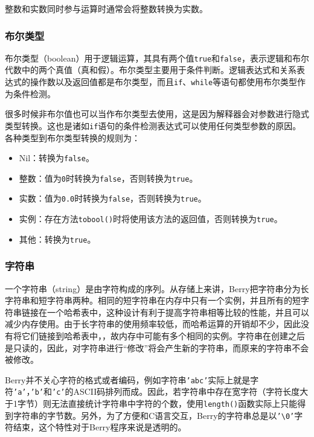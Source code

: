 整数和实数同时参与运算时通常会将整数转换为实数。

\subsubsection{布尔类型} \label{section:type_bool}

布尔类型（boolean）用于逻辑运算，其具有两个值\texttt{true}和\texttt{false}，表示逻辑和布尔代数中的两个真值（真和假）。布尔类型主要用于条件判断。逻辑表达式和关系表达式的操作数以及返回值都是布尔类型，而且\texttt{if}、\texttt{while}等语句都使用布尔类型作为条件检测。

很多时候非布尔值也可以当作布尔类型去使用，这是因为解释器会对参数进行隐式类型转换。这也是诸如\texttt{if}语句的条件检测表达式可以使用任何类型参数的原因。各种类型到布尔类型转换的规则为：
\begin{itemize}
    \item Nil：转换为\texttt{false}。
    \item 整数：值为\texttt{0}时转换为\texttt{false}，否则转换为\texttt{true}。
    \item 实数：值为\texttt{0.0}时转换为\texttt{false}，否则转换为\texttt{true}。
    \item 实例：存在方法\texttt{tobool()}时将使用该方法的返回值，否则转换为\texttt{true}。
    \item 其他：转换为\texttt{true}。
\end{itemize}

\subsubsection{字符串}

一个字符串（string）是由字符构成的序列。从存储上来讲，Berry把字符串分为长字符串和短字符串两种。相同的短字符串在内存中只有一个实例，并且所有的短字符串链接在一个哈希表中，这种设计有利于提高字符串相等比较的性能，并且可以减少内存使用。由于长字符串的使用频率较低，而哈希运算的开销却不少，因此没有将它们链接到哈希表中，，故内存中可能有多个相同的实例。字符串在创建之后是只读的，因此，对字符串进行``修改''将会产生新的字符串，而原来的字符串不会被修改。

Berry并不关心字符的格式或者编码，例如字符串\texttt{'abc'}实际上就是字符\texttt{'a'}，\texttt{'b'}和\texttt{'c'}的ASCII码排列而成。因此，若字符串中存在宽字符（字符长度大于1字节）则无法直接统计字符串中字符的个数，使用\texttt{length()}函数实际上只能得到字符串的字节数。另外，为了方便和C语言交互，Berry的字符串总是以\texttt{'\textbackslash 0'}字符结束，这个特性对于Berry程序来说是透明的。

